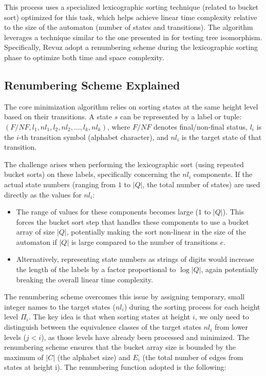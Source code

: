 This process uses a specialized lexicographic sorting technique (related to bucket sort) optimized for this task, which helps achieve linear time complexity relative to the size of the automaton (number of states and transitions). The algorithm leverages a technique similar to the one presented in \cite{aho1974design} for testing tree isomorphism. Specifically, Revuz adopt a renumbering scheme during the lexicographic sorting phase to optimize both time and space complexity. 

\subsection{Renumbering Scheme Explained}
The core minimization algorithm relies on sorting states at the same height level based on their transitions. A state $s$ can be represented by a label or tuple: $(F/NF, l_1, nl_1, l_2, nl_2, \dots, l_k, nl_k)$, where $F/NF$ denotes final/non-final status, $l_i$ is the $i$-th transition symbol (alphabet character), and $nl_i$ is the target state of that transition.

The challenge arises when performing the lexicographic sort (using repeated bucket sorts) on these labels, specifically concerning the $nl_i$ components. If the actual state numbers (ranging from $1$ to $|Q|$, the total number of states) are used directly as the values for $nl_i$:
\begin{itemize}
    \item The range of values for these components becomes large ($1$ to $|Q|$). This forces the bucket sort step that handles these components to use a bucket array of size $|Q|$, potentially making the sort non-linear in the size of the automaton if $|Q|$ is large compared to the number of transitions $e$.
    \item Alternatively, representing state numbers as strings of digits would increase the length of the labels by a factor proportional to $\log |Q|$, again potentially breaking the overall linear time complexity.
\end{itemize}

The renumbering scheme overcomes this issue by assigning temporary, small integer names to the target states ($nl_i$) during the sorting process for each height level $\Pi_i$. The key idea is that when sorting states at height $i$, we only need to distinguish between the equivalence classes of the target states $nl_i$ from lower levels ($j < i$), as those levels have already been processed and minimized. The renumbering scheme ensures that the bucket array size is bounded by the maximum of $|C|$ (the alphabet size) and $E_i$ (the total number of edges from states at height i). The renumbering function adopted is the following:

